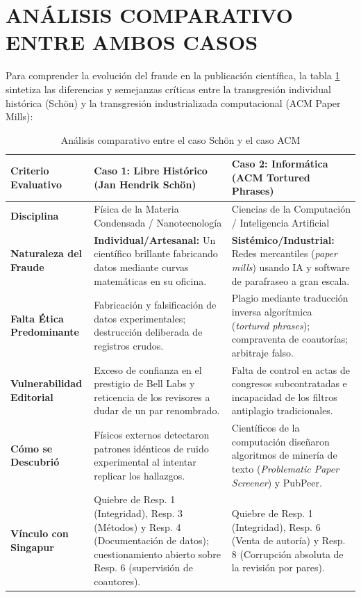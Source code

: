 \documentclass[12pt,a4paper]{article}
\let\oldsection\section
\renewcommand{\section}[1]{\needspace{5\baselineskip}\oldsection{#1}}
\begin{document}
\section{ANÁLISIS COMPARATIVO ENTRE AMBOS CASOS}
Para comprender la evolución del fraude en la publicación científica, la tabla \ref{tab:Comparacion} sintetiza las diferencias y semejanzas críticas entre la transgresión individual histórica (Schön) y la transgresión industrializada computacional (ACM Paper Mills):
\begin{table}[htbp]
\centering
\caption{Análisis comparativo entre el caso Schön y el caso ACM}
\label{tab:Comparacion}
\begin{tabularx}{\linewidth}{>{\hsize=0.7\hsize}X >{\hsize=1.15\hsize}X >{\hsize=1.15\hsize}X}
\toprule
\textbf{\textbf{Criterio Evaluativo}} & \textbf{\textbf{Caso 1: Libre Histórico (Jan Hendrik Schön)}} & \textbf{\textbf{Caso 2: Informática (ACM Tortured Phrases)}} \\
\midrule
\textbf{Disciplina} & Física de la Materia Condensada / Nanotecnología & Ciencias de la Computación / Inteligencia Artificial \\
\textbf{Naturaleza del Fraude} & \textbf{Individual/Artesanal:} Un científico brillante fabricando datos mediante curvas matemáticas en su oficina. & \textbf{Sistémico/Industrial:} Redes mercantiles (\textit{paper mills}) usando IA y software de parafraseo a gran escala. \\
\textbf{Falta Ética Predominante} & Fabricación y falsificación de datos experimentales; destrucción deliberada de registros crudos. & Plagio mediante traducción inversa algorítmica (\textit{tortured phrases}); compraventa de coautorías; arbitraje falso. \\
\textbf{Vulnerabilidad Editorial} & Exceso de confianza en el prestigio de Bell Labs y reticencia de los revisores a dudar de un par renombrado. & Falta de control en actas de congresos subcontratadas e incapacidad de los filtros antiplagio tradicionales. \\
\textbf{Cómo se Descubrió} & Físicos externos detectaron patrones idénticos de ruido experimental al intentar replicar los hallazgos. & Científicos de la computación diseñaron algoritmos de minería de texto (\textit{Problematic Paper Screener}) y PubPeer. \\
\textbf{Vínculo con Singapur} & Quiebre de Resp. 1 (Integridad), Resp. 3 (Métodos) y Resp. 4 (Documentación de datos); cuestionamiento abierto sobre Resp. 6 (supervisión de coautores). & Quiebre de Resp. 1 (Integridad), Resp. 6 (Venta de autoría) y Resp. 8 (Corrupción absoluta de la revisión por pares). \\

\end{tabularx}
\end{table}
\end{document}
